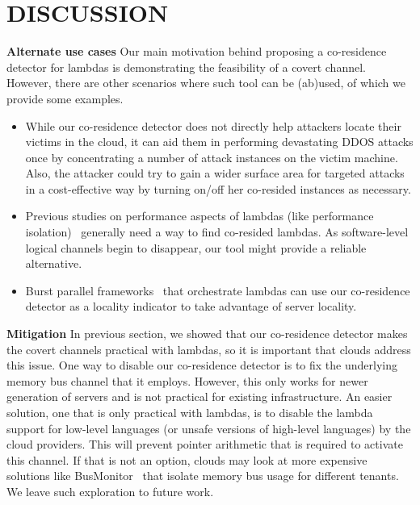 \section{DISCUSSION}
\label{sec:discussion}
\textbf{Alternate use cases}
Our main motivation behind proposing a co-residence detector for lambdas is
demonstrating the feasibility of a covert channel. However, there are other
scenarios where such tool can be (ab)used, of which we provide some examples. 
\begin{itemize}
    \item While our co-residence detector does not directly help attackers
    locate their victims in the cloud, it can aid them in performing devastating 
    DDOS attacks once by concentrating a number of attack instances on the victim 
    machine. Also, the attacker could try to gain a wider surface area for 
    targeted attacks in a cost-effective way by turning on/off her co-resided 
    instances as necessary. 
    \item Previous studies on performance aspects of lambdas (like performance 
    isolation)~\cite{wangusenix2018} generally need a way to find co-resided
    lambdas. As software-level logical channels begin to disappear, our tool 
    might provide a reliable alternative.
    \item Burst parallel frameworks~\cite{234886} that orchestrate lambdas can
    use our co-residence detector as a locality indicator to take advantage of
    server locality.
\end{itemize}

\textbf{Mitigation}
In previous section, we showed that our co-residence detector makes the covert
channels practical with lambdas, so it is important that clouds address this
issue. One way to disable our co-residence detector is to fix the underlying
memory bus channel that it employs. However, this only works for newer
generation of servers and is not practical for existing infrastructure. An
easier solution, one that is only practical with lambdas, is to disable the
lambda support for low-level languages (or unsafe versions of high-level
languages) by the cloud providers. This will prevent pointer arithmetic that is
required to activate this channel. If that is not an option, clouds may look at
more expensive solutions like BusMonitor~\cite{MemoryBusMitigation} that isolate
memory bus usage for different tenants. We leave such exploration to future
work.
